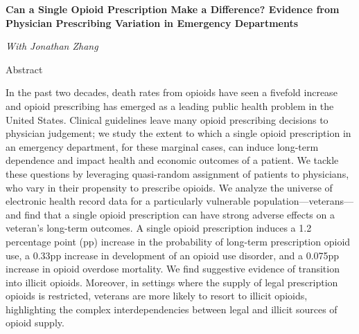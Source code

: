 \documentclass[letterpaper,11pt]{article}
\begin{document}
\Large{\textbf{Can a Single Opioid Prescription Make a Difference? Evidence from Physician Prescribing Variation in Emergency Departments}}

\small{\textit{With Jonathan Zhang}}


 \bigskip

Abstract

\medskip

In the past two decades, death rates from opioids have seen a fivefold increase and opioid prescribing has emerged as a leading public health problem in the United States. Clinical guidelines leave many opioid prescribing decisions to physician judgement; we study the extent to which a single opioid prescription in an emergency department, for these marginal cases, can induce long-term dependence and impact health and economic outcomes of a patient. We tackle these questions by leveraging quasi-random assignment of patients to physicians, who vary in their propensity to prescribe opioids. We analyze the universe of electronic health record data for a particularly vulnerable population—veterans—and find that a single opioid prescription can have strong adverse effects on a veteran’s long-term outcomes. A single opioid prescription induces a 1.2 percentage point (pp) increase in the probability of long-term prescription opioid use, a 0.33pp increase in development of an opioid use disorder, and a 0.075pp increase in opioid overdose mortality. We find suggestive evidence of transition into illicit opioids. Moreover, in settings where the supply of legal prescription opioids is restricted, veterans are more likely to resort to illicit opioids, highlighting the complex interdependencies between legal and illicit sources of opioid supply.
\end{document}
